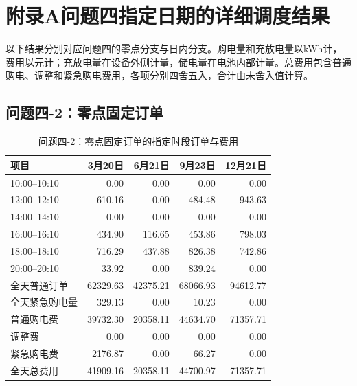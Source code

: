 \section*{附录A\quad 问题四指定日期的详细调度结果}
\label{app:q4_details}
以下结果分别对应问题四的零点分支与日内分支。购电量和充放电量以kWh计，费用以元计；充放电量在设备外侧计量，储电量在电池内部计量。总费用包含普通购电、调整和紧急购电费用，各项分别四舍五入，合计由未舍入值计算。

\subsection*{问题四-2：零点固定订单}

\begin{table}[H]
\centering
\small
{}
\setlength{\tabcolsep}{5pt}
\caption{问题四-2：零点固定订单的指定时段订单与费用}
\label{tab:app42_order}
\begin{tabular}{lrrrr}
\toprule
项目 & 3月20日 & 6月21日 & 9月23日 & 12月21日 \\
\midrule
10:00--10:10 & 0.00 & 0.00 & 0.00 & 0.00 \\
12:00--12:10 & 610.16 & 0.00 & 484.48 & 943.63 \\
14:00--14:10 & 0.00 & 0.00 & 0.00 & 0.00 \\
16:00--16:10 & 434.90 & 116.65 & 453.86 & 798.03 \\
18:00--18:10 & 716.29 & 437.88 & 826.38 & 742.86 \\
20:00--20:10 & 33.92 & 0.00 & 839.24 & 0.00 \\
全天普通订单 & 62329.63 & 42375.21 & 68066.93 & 94612.77 \\
全天紧急购电量 & 329.13 & 0.00 & 10.23 & 0.00 \\
普通购电费 & 39732.30 & 20358.11 & 44634.70 & 71357.71 \\
调整费 & 0.00 & 0.00 & 0.00 & 0.00 \\
紧急购电费 & 2176.87 & 0.00 & 66.27 & 0.00 \\
全天总费用 & 41909.16 & 20358.11 & 44700.97 & 71357.71 \\
\bottomrule
\end{tabular}
\end{table}

